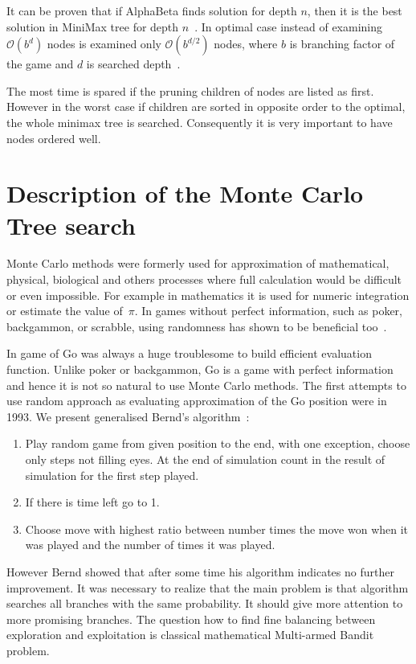 It can be proven that if AlphaBeta finds solution for depth $n$, then it is the
best solution in MiniMax tree for depth $n$~\cite{knuth:alphabeta}. In optimal
case instead of examining $\mathcal O(b^d)$ nodes is examined only $\mathcal
O(b^{d/2})$ nodes, where $b$ is branching factor of the game and $d$ is
searched depth~\cite{ZHONG}.

The most time is spared if the pruning children of nodes are listed as first.
However in the worst case if children are sorted in opposite order to the
optimal, the whole minimax tree is searched. Consequently it is very important
to have nodes ordered well.


\section{Description of the Monte Carlo Tree search}
Monte Carlo methods were formerly used for approximation of mathematical,
physical, biological and others processes where full calculation would be
difficult or even impossible. For example in mathematics it is used for numeric
integration or estimate the value of~$\pi$. In games without perfect
information, such as poker, backgammon, or scrabble, using randomness has shown
to be beneficial too~\cite{MonteCarloMethod, MonteCarloGo}.

In game of Go was always a huge troublesome to build efficient evaluation
function. Unlike poker or backgammon, Go is a game with perfect information and
hence it is not so natural to use Monte Carlo methods. The first attempts to
use random approach as evaluating approximation of the Go position were in
1993. We present generalised Bernd's algorithm~\cite{BERND,KOZELEK}:

\begin{enumerate}
\item Play random game from given position to the end, with one exception,
	choose only steps not filling eyes. At the end of simulation count in the
	result of simulation for the first step played.
\item If there is time left go to 1.
\item Choose move with highest ratio between number times the move won when it
	  was played and the number of times it was played.
\end{enumerate}

However Bernd showed that after some time his algorithm indicates no further
improvement. It was necessary to realize that the main problem is that
algorithm searches all branches with the same probability. It should give more
attention to more promising branches. The question how to find fine balancing
between exploration and exploitation is classical mathematical Multi-armed
Bandit problem.


